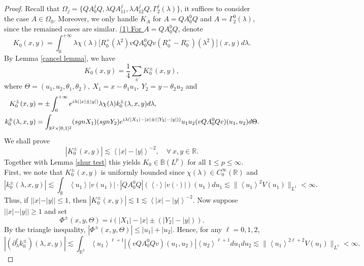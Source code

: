 \documentclass[10pt,a4paper]{amsart}
\newcommand\B{\mathbb{B}}
\newcommand\R{\mathbb{R}}
\begin{document}
\begin{proof} Recall that $\Omega_j=\{QA^j_0Q,\lambda QA^j_{11},\lambda A^j_{12}Q,  \Gamma^j_2(\lambda)\}$, it suffices to consider the case $A\in\Omega_0$. Moreover, we only handle $K_A$ for $A=QA^0_0Q$ and $A=\Gamma^0_2(\lambda)$, since the remained cases are similar.
\vskip0.2cm
\underline{(1) For $A=QA^0_0Q$}, denote
\begin{equation*}
K_0(x,y)=\int_{0}^{+\infty}\lambda\chi(\lambda)\big[R^+_0(\lambda^{2})vQA^0_0Qv(R^+_0-R^-_0)(\lambda^{2})\big](x,y)d\lambda.
\end{equation*}
By Lemma \ref{cancel lemma}, we have 
\begin{equation*}
    K_0(x,y)=\frac{1}{4}\sum\limits_{\pm}K^{\pm}_0(x,y),
\end{equation*}
where $\Theta=(u_1,u_2,\theta_1,\theta_2),\ X_1=x-\theta_1u_1,\ Y_2=y-\theta_2u_2$ and 
\begin{align*}
K^{\pm}_0(x,y)&=\pm\int_{0}^{+\infty}e^{i\lambda(|x|\pm|y|)}\lambda\chi(\lambda)k^{\pm}_0(\lambda,x,y)d\lambda,\\
k^{\pm}_0(\lambda,x,y)&=\int_{\R^2\times[0,1]^2}({\rm sgn}X_1)({\rm sgn}Y_2)e^{i\lambda(|X_1|-|x|\pm (|Y_2|-|y|))}u_1u_2(vQA^0_0Qv)(u_1,u_2)d\Theta.
\end{align*}
We shall prove \begin{equation}\label{esti of Kpm0}
    |K^{\pm}_{0}(x,y)|\lesssim\left<|x|-|y|\right>^{-2},\quad \forall\  x,y\in \R.
\end{equation}
Together with Lemma \ref{shur test} this yields $K_0\in \B(L^p)$ for all $1\leq p\leq\infty$. First, we note that $K^{\pm}_0(x,y)$ is uniformly bounded since $\chi(\lambda)\in C^{\infty}_0(\R)$ and 
\begin{equation*}
|k^{\pm}_0(\lambda,x,y)|\lesssim \int_{\R}\left<u_1\right>|v(u_1)|\cdot |QA^0_0Q|(\left<\cdot\right>|v(\cdot)|)(u_1)du_1 \lesssim\|\left<u_1\right>^2V(u_1)\|_{L^1} <\infty. 
\end{equation*}
Thus, if $||x|-|y||\leq1$, then $|K^{\pm}_{0}(x,y)|\lesssim1\lesssim\left<|x|-|y|\right>^{-2}.$ Now suppose $||x|-|y||\geq1$ and set $$\Phi^{\pm}(x,y,\Theta)=i(|X_1|-|x|\pm (|Y_2|-|y|)).$$
By the triangle inequality, $\left|\Phi^{\pm}(x,y,\Theta)\right|\leq |u_1|+|u_2|$. Hence, for any $\ell=0,1,2$, 
\begin{equation}\label{estimate of k_0}
|(\partial^{\ell}_{\lambda}k^{\pm}_0)(\lambda,x,y)|\lesssim
\int_{\R^2}^{}\left<u_1\right>^{\ell+1}|(vQA^0_0Qv)(u_1,u_2)|\left<u_2\right>^{\ell+1}du_1du_2\lesssim \|\left<u_1\right>^{2\ell+2}V(u_1)\|_{L^1} <\infty.

\end{equation}
\end{proof}
\end{document}

